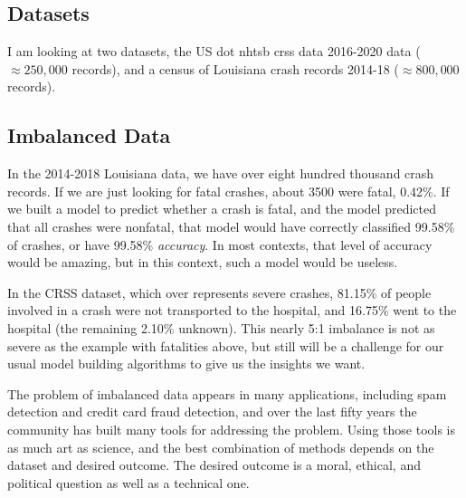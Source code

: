 \subsection{Datasets}

I am looking at two datasets,  the US \acrfull{dot} \acrfull{nhtsb} \acrfull{crss} data 2016-2020 data ($\approx 250,000$ records), and a census of Louisiana crash records 2014-18 ($\approx 800,000$ records).

\subsection{Imbalanced Data}

In the 2014-2018 Louisiana data, we have over eight hundred thousand crash records.  If we are just looking for fatal crashes, about 3500 were fatal, 0.42\%.  If we built a model to predict whether a crash is fatal, and the model predicted that all crashes were nonfatal, that model would have correctly classified 99.58\% of crashes, or have 99.58\% {\it accuracy}.  In most contexts, that level of accuracy would be amazing, but in this context, such a model would be useless. 

In the CRSS dataset, which over represents severe crashes, 81.15\% of people involved in a crash were not transported to the hospital, and 16.75\% went to the hospital (the remaining 2.10\% unknown).  This nearly 5:1 imbalance is not as severe as the example with fatalities above, but still will be a challenge for our usual model building algorithms to give us the insights we want.  

The problem of imbalanced data appears in many applications, including spam detection and credit card fraud detection, and over the last fifty years the community has built many tools for addressing the problem.  Using those tools is as much art as science, and the best combination of methods depends on the dataset and desired outcome.  The desired outcome is a moral, ethical, and political question as well as a technical one.  


